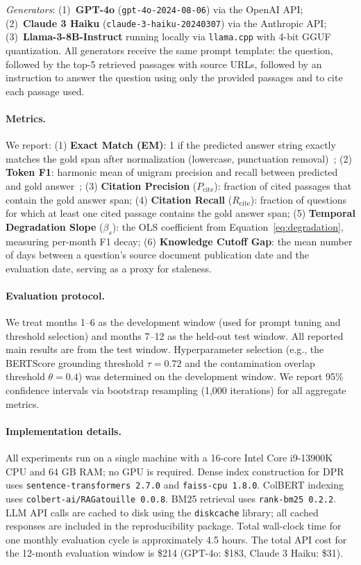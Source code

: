 \noindent\textit{Generators}: (1)~\textbf{GPT-4o} (\texttt{gpt-4o-2024-08-06}) via the OpenAI API; (2)~\textbf{Claude 3 Haiku} (\texttt{claude-3-haiku-20240307}) via the Anthropic API; (3)~\textbf{Llama-3-8B-Instruct} running locally via \texttt{llama.cpp} with 4-bit GGUF quantization. All generators receive the same prompt template: the question, followed by the top-5 retrieved passages with source URLs, followed by an instruction to answer the question using only the provided passages and to cite each passage used.

\paragraph{Metrics.}
We report: (1) \textbf{Exact Match (EM)}: 1 if the predicted answer string exactly matches the gold span after normalization (lowercase, punctuation removal)~\citep{joshi2017triviaqa}; (2) \textbf{Token F1}: harmonic mean of unigram precision and recall between predicted and gold answer~\citep{kwiatkowski2019nq}; (3) \textbf{Citation Precision} ($P_{\text{cite}}$): fraction of cited passages that contain the gold answer span; (4) \textbf{Citation Recall} ($R_{\text{cite}}$): fraction of questions for which at least one cited passage contains the gold answer span; (5) \textbf{Temporal Degradation Slope} ($\beta_s$): the OLS coefficient from Equation~\ref{eq:degradation}, measuring per-month F1 decay; (6) \textbf{Knowledge Cutoff Gap}: the mean number of days between a question's source document publication date and the evaluation date, serving as a proxy for staleness.

\paragraph{Evaluation protocol.}
We treat months 1--6 as the development window (used for prompt tuning and threshold selection) and months 7--12 as the held-out test window. All reported main results are from the test window. Hyperparameter selection (e.g., the BERTScore grounding threshold $\tau = 0.72$ and the contamination overlap threshold $\theta = 0.4$) was determined on the development window. We report 95\% confidence intervals via bootstrap resampling (1,000 iterations) for all aggregate metrics.

\paragraph{Implementation details.}
All experiments run on a single machine with a 16-core Intel Core i9-13900K CPU and 64 GB RAM; no GPU is required. Dense index construction for DPR uses \texttt{sentence-transformers 2.7.0} and \texttt{faiss-cpu 1.8.0}. ColBERT indexing uses \texttt{colbert-ai/RAGatouille 0.0.8}. BM25 retrieval uses \texttt{rank-bm25 0.2.2}. LLM API calls are cached to disk using the \texttt{diskcache} library; all cached responses are included in the reproducibility package. Total wall-clock time for one monthly evaluation cycle is approximately 4.5 hours. The total API cost for the 12-month evaluation window is \$214 (GPT-4o: \$183, Claude 3 Haiku: \$31).

